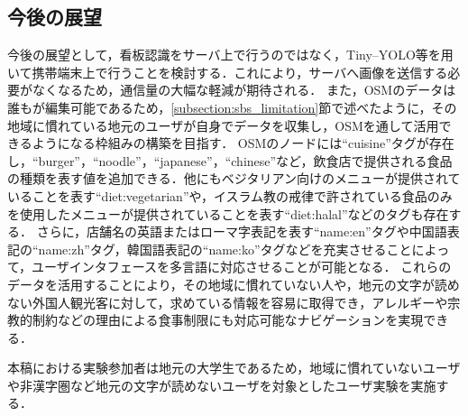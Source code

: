 \subsection{今後の展望}
  今後の展望として，看板認識をサーバ上で行うのではなく，Tiny--YOLO等を用いて携帯端末上で行うことを検討する．これにより，サーバへ画像を送信する必要がなくなるため，通信量の大幅な軽減が期待される．
  また，OSMのデータは誰もが編集可能であるため，\ref{subsection:sbs_limitation}節で述べたように，その地域に慣れている地元のユーザが自身でデータを収集し，OSMを通して活用できるようになる枠組みの構築を目指す．
  OSMのノードには``cuisine''タグが存在し，``burger''，``noodle''，``japanese''，``chinese''など，飲食店で提供される食品の種類を表す値を追加できる．他にもベジタリアン向けのメニューが提供されていることを表す``diet:vegetarian''や，イスラム教の戒律で許されている食品のみを使用したメニューが提供されていることを表す``diet:halal''などのタグも存在する．
  さらに，店舗名の英語またはローマ字表記を表す``name:en''タグや中国語表記の``name:zh''タグ，韓国語表記の``name:ko''タグなどを充実させることによって，ユーザインタフェースを多言語に対応させることが可能となる．
  これらのデータを活用することにより，その地域に慣れていない人や，地元の文字が読めない外国人観光客に対して，求めている情報を容易に取得でき，アレルギーや宗教的制約などの理由による食事制限にも対応可能なナビゲーションを実現できる．
  
  本稿における実験参加者は地元の大学生であるため，地域に慣れていないユーザや非漢字圏など地元の文字が読めないユーザを対象としたユーザ実験を実施する．

